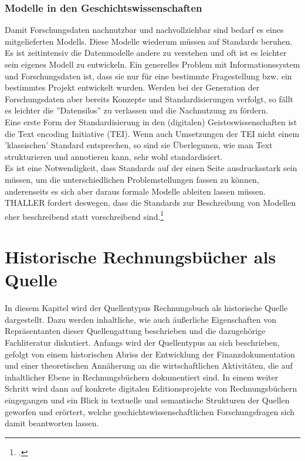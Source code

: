 \documentclass[12pt,a4paper]{article}
\begin{document}
\subsubsection{Modelle in den Geschichtswissenschaften}

Damit Forschungsdaten nachnutzbar und nachvollziehbar sind bedarf es eines mitgelieferten Modells. Diese Modelle wiederum müssen auf Standards beruhen. Es ist zeitintensiv die Datenmodelle andere zu verstehen und oft ist es leichter sein eigenes Modell zu entwickeln. Ein generelles Problem mit Informationssystem und Forschungsdaten ist, dass sie nur für eine bestimmte Fragestellung bzw. ein bestimmtes Projekt entwickelt wurden. Werden bei der Generation der Forschungsdaten aber bereits Konzepte und Standardisierungen verfolgt, so fällt es leichter die ''Datensilos'' zu verlassen und die Nachnutzung zu fördern. 
\\
Eine erste Form der Standardisierung in den (digitalen) Geisteswissenschaften ist die Text encoding Initiative (TEI). Wenn auch Umsetzungen der TEI nicht einem 'klassischen' Standard entsprechen, so sind sie Überlegunen, wie man Text strukturieren und annotieren kann, sehr wohl standardisiert. 
\\
Es ist eine Notwendigkeit, dass Standards auf der einen Seite ausdrucksstark sein müssen, um die unterschiedlichen Problemstellungen fassen zu können, anderenseits es sich aber daraus formale Modelle ableiten lassen müssen. THALLER fordert deswegen, dass die Standards zur Beschreibung von Modellen eher beschreibend statt  vorschreibend sind.\footcite[][S.204]{thaller2017need}

\newpage
\section{Historische Rechnungsbücher als Quelle}
\label{ref:Rechnung}

In diesem Kapitel wird der Quellentypus Rechnungsbuch als historische Quelle dargestellt. Dazu werden inhaltliche, wie auch äußerliche Eigenschaften von Repräsentanten dieser Quellengattung beschrieben und die dazugehörige Fachliteratur diskutiert.
Anfangs wird der Quellentypus an sich beschrieben, gefolgt von einem historischen Abriss der Entwicklung der Finanzdokumentation und einer theoretischen Annäherung an die wirtschaftlichen Aktivitäten, die auf inhaltlicher Ebene in Rechnungsbüchern dokumentiert sind. In einem weiter Schritt wird dann auf konkrete digitalen Editionsprojekte von Rechnungsbüchern eingegangen und ein Blick in textuelle und semantische Strukturen der Quellen geworfen und erörtert, welche geschichtswissenschaftlichen Forschungsfragen sich damit beantworten lassen.
\end{document}
